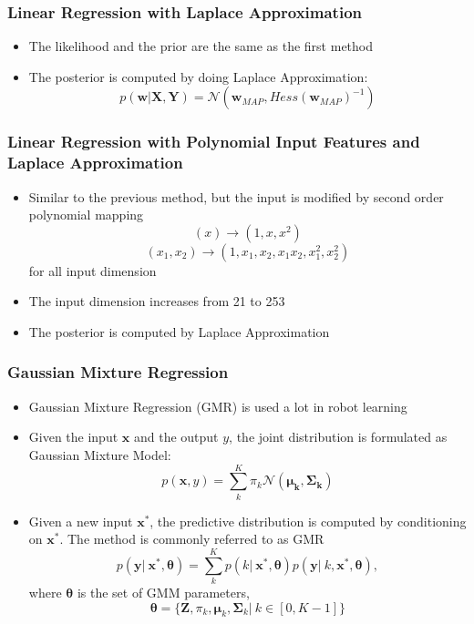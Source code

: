 \documentclass[xcolor=table]{beamer}
\begin{document}
\begin{frame}
\frametitle{Linear Regression with Laplace Approximation}
\centering
\begin{itemize}
\item The likelihood and the prior are the same as the first method
\item The posterior is computed by doing Laplace Approximation:
\begin{equation}
p(\bm{w}|\bm{X},\bm{Y}) = \mathcal{N}\left(\bm{w}_{MAP}, Hess(\bm{w}_{MAP})^{-1}\right)  
\end{equation}
\end{itemize}
\end{frame}

\begin{frame}
\frametitle{Linear Regression with Polynomial Input Features and Laplace Approximation}
\centering
\begin{itemize}

\item Similar to the previous method, but the input is modified by second order polynomial mapping
\begin{equation}
(x) \rightarrow (1, x, x^2)
\end{equation}
\begin{equation}
(x_1, x_2) \rightarrow (1, x_1, x_2, x_1x_2, x_1^2, x_2^2 )
\end{equation}
%
for all input dimension

\item The input dimension increases from 21 to 253

\item The posterior is computed by Laplace Approximation
\end{itemize}

\end{frame}

\begin{frame}
\frametitle{Gaussian Mixture Regression}
\centering
\begin{itemize}
\item Gaussian Mixture Regression (GMR) is used a lot in robot learning
\item Given the input $\bm{x}$ and the output $y$, the joint distribution is formulated as Gaussian Mixture Model: 
\begin{equation}
p(\bm{x},y) = \sum_k^K \pi_k \mathcal{N}(\bm{\mu_k},\bm{\Sigma_k})
\end{equation}
\item Given a new input $\bm{x}^*$, the predictive distribution is computed by conditioning on $\bm{x}^*$. The method is commonly referred to as GMR
\begin{equation}
p(\bm{y}|~\bm{x}^*,\bm{\theta}) = \sum_k^K p(k|~\bm{x}^*,\bm{\theta}) p(\bm{y}|~k,\bm{x}^*,\bm{\theta}), 
\end{equation}
where $\bm{\theta}$ is the set of GMM parameters, 
\begin{equation}
\bm{\theta} = \{\bm{Z}, \pi_k,\bm{\mu}_k, \bm{\Sigma}_k |~k \in [0, K-1]\}
\end{equation}
\end{itemize}

\end{frame}
\end{document}

